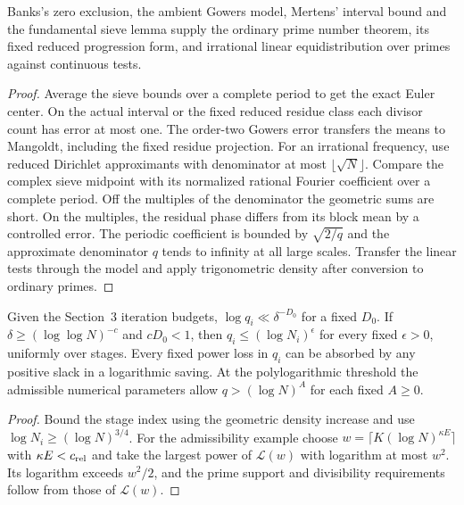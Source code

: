 \begin{lemma}\label{checked-prime-distribution}
\leanok
Banks's zero exclusion, the ambient Gowers model, Mertens' interval
bound and the fundamental sieve lemma supply the ordinary prime
number theorem, its fixed reduced progression form, and irrational
linear equidistribution over primes against continuous tests.
\end{lemma}
\begin{proof}
\leanok
Average the sieve bounds over a complete period to get the exact
Euler center. On the actual interval or the fixed reduced residue
class each divisor count has error at most one. The order-two
Gowers error transfers the means to Mangoldt, including the fixed
residue projection. For an irrational frequency, use reduced
Dirichlet approximants with denominator at most $\lfloor\sqrt N\rfloor$.
Compare the complex sieve midpoint with its normalized rational
Fourier coefficient over a complete period. Off the multiples of
the denominator the geometric sums are short. On the multiples,
the residual phase differs from its block mean by a controlled
error. The periodic coefficient is bounded by $\sqrt{2/q}$ and the
approximate denominator $q$ tends to infinity at all large scales.
Transfer the linear tests through the model and apply trigonometric
density after conversion to ordinary primes.
\end{proof}

\begin{lemma}\label{checked-iteration-moduli}
\leanok
Given the Section~3 iteration budgets, $\log q_i\ll\delta^{-D_0}$
for a fixed $D_0$. If $\delta\ge(\log\log N)^{-c}$ and $cD_0<1$,
then $q_i\le(\log N_i)^\epsilon$ for every fixed $\epsilon>0$,
uniformly over stages. Every fixed power loss in $q_i$ can be
absorbed by any positive slack in a logarithmic saving. At the
polylogarithmic threshold the admissible numerical parameters allow
$q>(\log N)^A$ for each fixed $A\ge0$.
\end{lemma}
\begin{proof}
\leanok
Bound the stage index using the geometric density increase and
use $\log N_i\ge(\log N)^{3/4}$. For the admissibility example
choose $w=\lceil K(\log N)^{\kappa E}\rceil$ with $\kappa E<c_{\rm rel}$
and take the largest power of $\mathcal L(w)$ with logarithm at
most $w^2$. Its logarithm exceeds $w^2/2$, and the prime support
and divisibility requirements follow from those of $\mathcal L(w)$.
\end{proof}

